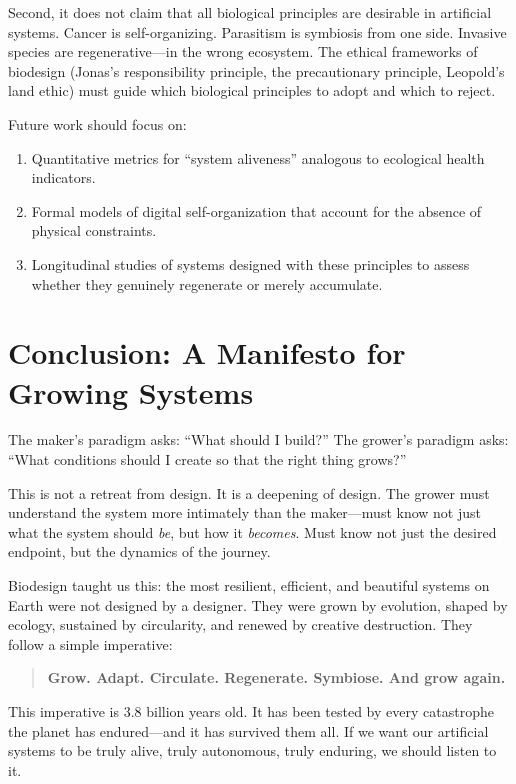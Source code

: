 \documentclass[11pt,a4paper]{article}
\begin{document}
Second, it does not claim that all biological principles are desirable in artificial systems. Cancer is self-organizing. Parasitism is symbiosis from one side. Invasive species are regenerative---in the wrong ecosystem. The ethical frameworks of biodesign (Jonas's responsibility principle, the precautionary principle, Leopold's land ethic) must guide which biological principles to adopt and which to reject.

Future work should focus on:
\begin{enumerate}
  \item Quantitative metrics for ``system aliveness'' analogous to ecological health indicators.
  \item Formal models of digital self-organization that account for the absence of physical constraints.
  \item Longitudinal studies of systems designed with these principles to assess whether they genuinely regenerate or merely accumulate.
\end{enumerate}

\section{Conclusion: A Manifesto for Growing Systems}

The maker's paradigm asks: ``What should I build?''
The grower's paradigm asks: ``What conditions should I create so that the right thing grows?''

This is not a retreat from design. It is a deepening of design. The grower must understand the system more intimately than the maker---must know not just what the system should \emph{be}, but how it \emph{becomes}. Must know not just the desired endpoint, but the dynamics of the journey.

Biodesign taught us this: the most resilient, efficient, and beautiful systems on Earth were not designed by a designer. They were grown by evolution, shaped by ecology, sustained by circularity, and renewed by creative destruction. They follow a simple imperative:

\begin{quote}
\textbf{Grow. Adapt. Circulate. Regenerate. Symbiose. And grow again.}
\end{quote}

This imperative is 3.8 billion years old. It has been tested by every catastrophe the planet has endured---and it has survived them all. If we want our artificial systems to be truly alive, truly autonomous, truly enduring, we should listen to it.
\end{document}
